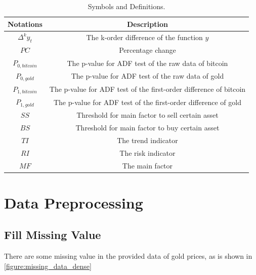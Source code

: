 \documentclass[12pt,a4paper]{article}
\begin{document}
\begin{spacing}{1.2}
\begin{table}[H]
	\renewcommand{\arraystretch}{1.5}
	\caption{Symbols and Definitions.}
	\label{Table_Symbols}
	\begin{center}
		{\footnotesize
			\begin{tabular}{c c}
				\toprule
				{Notations} & {Description} \\
				\midrule
				{$\Delta^ky_t$} & {The k-order difference of the function $y$} \\
				{$PC$}    & {Percentage change} \\ 
				{$P_{0,bitcoin}$}     & { The p-value for ADF test of the raw data of bitcoin} \\ 
				$P_{0,gold}$   & {The p-value for ADF test of the raw data of gold} \\ 
				$P_{1,bitcoin}$     & { The p-value for ADF test of the first-order difference of bitcoin} \\
				$P_{1,gold}$     & {The p-value for ADF test of the first-order difference of gold} \\ 
				$SS$     & {Threshold for main factor to sell certain asset} \\ 
				$BS$    & {Threshold for main factor to buy certain asset} \\ 
				$TI$     & {The trend indicator} \\ 
				$RI$     & {The risk indicator} \\ 
				$MF$     & {The main factor} \\ 
				\bottomrule
		\end{tabular}}
	\end{center}
\end{table}





\section{Data Preprocessing}
\label{DataPreprocessing}

\subsection{Fill Missing Value}
There are some missing value in the provided data of gold prices, as is shown in  \ref{figure:missing_data_dense}



\end{spacing}
\end{document}
